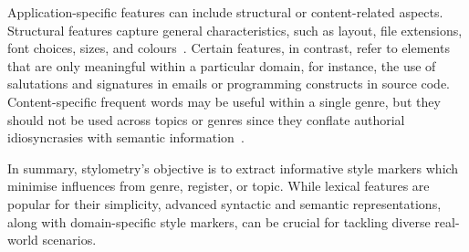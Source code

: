 Application-specific features can include structural or content-related aspects. 
Structural features capture general characteristics, such as layout, file extensions, font choices, sizes, and colours~\citep{abbasi_writeprints_2008,neal_surveying_2018}. 
Certain features, in contrast, refer to elements that are only meaningful within a particular domain, for instance, the use of salutations and signatures in emails or programming constructs in source code. 
Content-specific frequent words may be useful within a single genre, but they should not be used across topics or genres since they conflate authorial idiosyncrasies with semantic information~\citep{abbasi_writeprints_2008}.


In summary, stylometry's objective is to extract informative style markers which minimise influences from genre, register, or topic. 
While lexical features are popular for their simplicity, advanced syntactic and semantic representations, along with domain-specific style markers, can be crucial for tackling diverse real-world scenarios.
